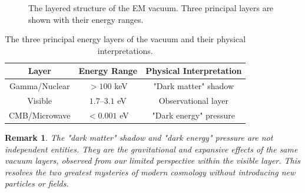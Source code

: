\documentclass[12pt,oneside]{book}
\newtheorem{remark}{Remark}[chapter]
\begin{document}
\begin{figure}[H]
\centering
{}
\caption{The layered structure of the EM vacuum. Three principal layers are shown with their energy ranges.}
\label{fig:layers}
\end{figure}

\begin{table}[H]
\centering
\begin{tabular}{|c|c|c|}
\hline
\textbf{Layer} & \textbf{Energy Range} & \textbf{Physical Interpretation} \\
\hline
Gamma/Nuclear & $> 100$ keV & "Dark matter" shadow \\
Visible & $1.7$--$3.1$ eV & Observational layer \\
CMB/Microwave & $< 0.001$ eV & "Dark energy" pressure \\
\hline
\end{tabular}
\caption{The three principal energy layers of the vacuum and their physical interpretations.}
\end{table}

\begin{remark}
The "dark matter" shadow and "dark energy" pressure are not independent entities. They are the gravitational and expansive effects of the same vacuum layers, observed from our limited perspective within the visible layer. This resolves the two greatest mysteries of modern cosmology without introducing new particles or fields.
\end{remark}
\end{document}
